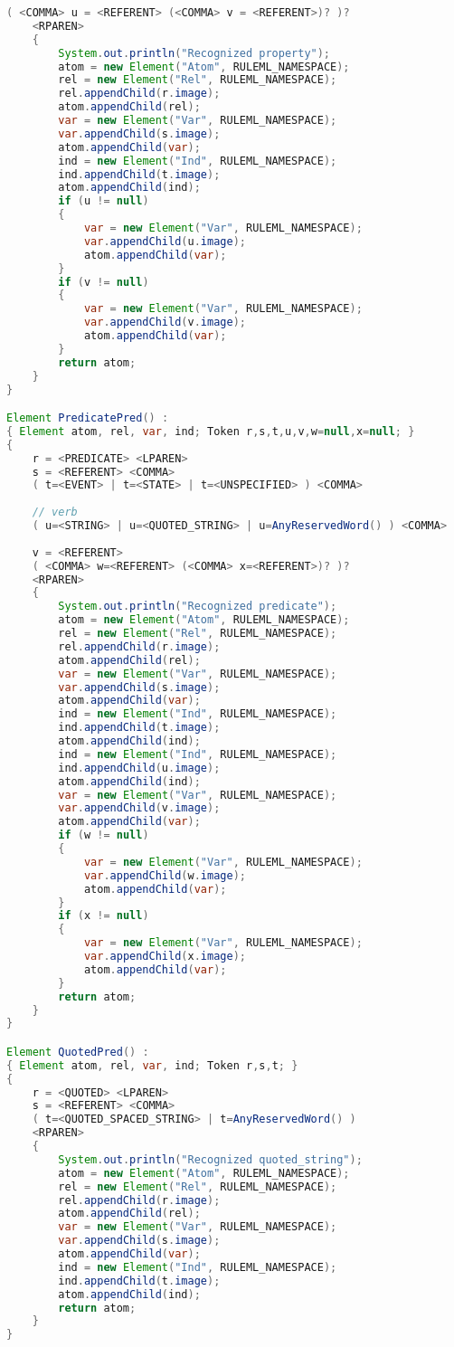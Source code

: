 \documentclass[12pt]{report}
\begin{document}
\begin{lstlisting}[language=java, showstringspaces=false, tabsize=2]
	( <COMMA> u = <REFERENT> (<COMMA> v = <REFERENT>)? )?
	<RPAREN> 
	{
		System.out.println("Recognized property");
		atom = new Element("Atom", RULEML_NAMESPACE);
		rel = new Element("Rel", RULEML_NAMESPACE);
		rel.appendChild(r.image);
		atom.appendChild(rel);
		var = new Element("Var", RULEML_NAMESPACE);
		var.appendChild(s.image);
		atom.appendChild(var);
		ind = new Element("Ind", RULEML_NAMESPACE);
		ind.appendChild(t.image);
		atom.appendChild(ind);
		if (u != null)
		{
			var = new Element("Var", RULEML_NAMESPACE);
			var.appendChild(u.image);
			atom.appendChild(var);
		}
		if (v != null)
		{
			var = new Element("Var", RULEML_NAMESPACE);
			var.appendChild(v.image);
			atom.appendChild(var);
		}
		return atom;
	}
}

Element PredicatePred() :
{ Element atom, rel, var, ind; Token r,s,t,u,v,w=null,x=null; }
{
	r = <PREDICATE> <LPAREN>
	s = <REFERENT> <COMMA>
	( t=<EVENT> | t=<STATE> | t=<UNSPECIFIED> ) <COMMA>
	
	// verb
	( u=<STRING> | u=<QUOTED_STRING> | u=AnyReservedWord() ) <COMMA>
	
	v = <REFERENT>
	( <COMMA> w=<REFERENT> (<COMMA> x=<REFERENT>)? )?
	<RPAREN>
	{
		System.out.println("Recognized predicate");
		atom = new Element("Atom", RULEML_NAMESPACE);
		rel = new Element("Rel", RULEML_NAMESPACE);
		rel.appendChild(r.image);
		atom.appendChild(rel);
		var = new Element("Var", RULEML_NAMESPACE);
		var.appendChild(s.image);
		atom.appendChild(var);
		ind = new Element("Ind", RULEML_NAMESPACE);
		ind.appendChild(t.image);
		atom.appendChild(ind);
		ind = new Element("Ind", RULEML_NAMESPACE);
		ind.appendChild(u.image);
		atom.appendChild(ind);
		var = new Element("Var", RULEML_NAMESPACE);
		var.appendChild(v.image);
		atom.appendChild(var);
		if (w != null)
		{
			var = new Element("Var", RULEML_NAMESPACE);
			var.appendChild(w.image);
			atom.appendChild(var);
		}
		if (x != null)
		{
			var = new Element("Var", RULEML_NAMESPACE);
			var.appendChild(x.image);
			atom.appendChild(var);
		}
		return atom;
	}
}

Element QuotedPred() :
{ Element atom, rel, var, ind; Token r,s,t; }
{
	r = <QUOTED> <LPAREN>
	s = <REFERENT> <COMMA>
	( t=<QUOTED_SPACED_STRING> | t=AnyReservedWord() )
	<RPAREN>
	{
		System.out.println("Recognized quoted_string");
		atom = new Element("Atom", RULEML_NAMESPACE);
		rel = new Element("Rel", RULEML_NAMESPACE);
		rel.appendChild(r.image);
		atom.appendChild(rel);
		var = new Element("Var", RULEML_NAMESPACE);
		var.appendChild(s.image);
		atom.appendChild(var);
		ind = new Element("Ind", RULEML_NAMESPACE);
		ind.appendChild(t.image);
		atom.appendChild(ind);
		return atom;
	}
}


\end{lstlisting}
\end{document}
